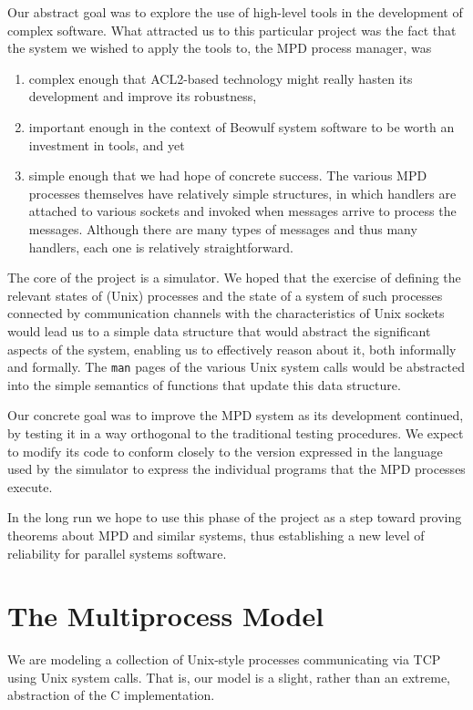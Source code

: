 \documentclass{article}
\begin{document}
Our abstract goal was to explore the use of high-level tools in the
development of complex software.  What attracted us to this particular project
was the fact that the system we wished to apply the tools to, the MPD
process manager, was 
\begin{enumerate}
\item complex enough that ACL2-based technology might really hasten its
  development and improve its robustness,
\item important enough in the context of Beowulf system software to be worth
  an investment in tools, and yet
\item simple enough that we had hope of concrete success.  The various MPD
  processes themselves have relatively simple structures, in which handlers are
  attached to various sockets and invoked when messages arrive to process the
  messages.  Although there are many types of messages and thus many handlers,
  each one is relatively straightforward.
\end{enumerate}

The core of the project is a simulator.  We hoped that the exercise of
defining the relevant states of (Unix) processes and the state of a system of
such processes connected by communication channels with the characteristics of
Unix sockets would lead us to a simple data structure that would abstract the
significant aspects of the system, enabling us to effectively reason about it,
both informally and formally.  The {\tt man} pages of the various Unix system
calls would be abstracted into the simple semantics of functions that update
this data structure.

Our concrete goal was to improve the MPD system as its development
continued, by testing it in a way orthogonal to the traditional
testing procedures.  We expect to modify its code to conform closely to the
version expressed in the language used by the simulator to express the
individual programs that the MPD processes execute.

In the long run we hope to use this phase of the project as a step toward
proving theorems about MPD and similar systems, thus establishing a new level
of reliability for parallel systems software. 

\section{The Multiprocess Model}

We are modeling a collection of Unix-style processes communicating via
TCP using Unix system calls.  That is, our model is a slight, rather than an
extreme, abstraction of the C implementation.
\end{document}
